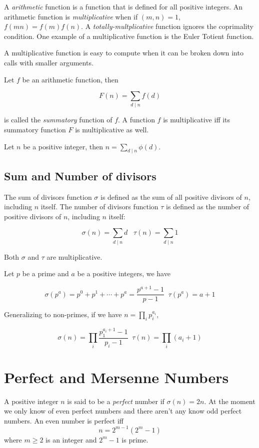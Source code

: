 \documentclass{article}
\begin{document}
\begin{multicols*}{2}
A \textit{arithmetic} function is a function that is defined for all positive integers. An arithmetic function is \textit{multiplicative} when if $(m,n) = 1$, $f(mn) = f(m)f(n)$. A \textit{totally-multplicative} function ignores the coprimality condition. One example of a multiplicative function is the Euler Totient function.

A multiplicative function is easy to compute when it can be broken down into calls with smaller arguments.

Let $f$ be an arithmetic function, then

\[F(n) = \sum_{d \mid n} f(d)\]

is called the  \textit{summatory} function of $f$. A function $f$ is multiplicative iff its summatory function $F$ is multiplicative as well.

Let $n$ be a positive integer, then $n = \sum_{d \mid n}\phi(d)$.

\subsection*{Sum and Number of divisors}

The sum of divisors function $\sigma$ is defined as the sum of all positive divisors of $n$, including $n$ itself. The number of divisors function $\tau$ is defined as the number of positive divisors of $n$, including $n$ itself:

\[\sigma(n) = \sum_{d \mid n} d \;\;\; \tau(n) = \sum_{d \mid n} 1\]

Both $\sigma$ and $\tau$ are multiplicative.

Let $p$ be a prime and $a$ be a positive integers, we have

\[\sigma(p^a) = p^0 + p^1 + \cdots + p^a = \frac{p^{a+1} - 1}{p-1}\;\;\tau(p^a) = a + 1\]

Generalizing to non-primes, if we have $n = \prod_{i}p_i^{a_i}$,

\[\sigma(n) = \prod_{i}\frac{p_1^{a_i+1} - 1}{p_i-1}\;\;\tau(n) = \prod_{i}(a_i + 1)\]

\section{Perfect and Mersenne Numbers}

A positive integer $n$ is said to be a \textit{perfect} number if $\sigma(n) = 2n$. At the moment we only know of even perfect numbers and there aren't any know odd perfect numbers. An even number is perfect iff \[n = 2^{m-1}(2^m - 1)\] where $m \geq 2$ is an integer and $2^m - 1$ is prime.


\end{multicols*}
\end{document}
